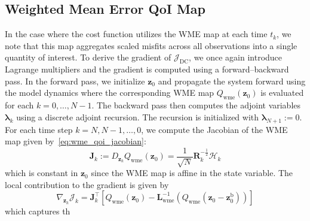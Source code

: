 \documentclass[final,1p,times]{elsarticle}
\begin{document}
\subsection{Weighted Mean Error QoI Map}
In the case where the cost function utilizes the WME map at each time $ t_k $, we note that this map aggregates scaled misfits across all observations into a single quantity of interest. To derive the gradient of $ \mathcal{J}_{\mathrm{DC}} $, we once again introduce Lagrange multipliers and the gradient is computed using a forward–backward pass. In the forward pass, we initialize $ \mathbf{z}_0 $ and propagate the system forward using the model dynamics where the corresponding WME map $ Q_{\mathrm{wme}}(\mathbf{z}_0) $ is evaluated for each $k=0,\ldots, N-1$. 
The backward pass then computes the adjoint variables $ \boldsymbol{\lambda}_k $ using a discrete adjoint recursion. The recursion is initialized with $ \boldsymbol{\lambda}_{N+1} := 0 $.  For each time step $ k = N, N-1, \dots, 0 $, we compute the Jacobian of the WME map given by~\eqref{eq:wme_qoi_jacobian}:
\begin{equation}
    \mathbf{J}_k := D_{\mathbf{z}_k} Q_{\mathrm{wme}}(\mathbf{z}_0) = \frac{1}{\sqrt{N}} \mathbf{R}^{-\frac{1}{2}}_{k}\mathcal{H}_{k}
\end{equation} which is constant in $ \mathbf{z}_0 $ since the WME map is affine in the state variable. 
The local contribution to the gradient is given by
\begin{equation}
\nabla_{\mathbf{z}_k} \mathcal{J}_k =
      \mathbf{J}_k^\top \left[
         Q_{\mathrm{wme}}\left(\mathbf{z}_0\right) - \mathbf{L}_{\mathrm{wme}}^{-1} \left(Q_{\mathrm{wme}}\left(\mathbf{z}_0 -\mathbf{z}_0^{\mathrm{b}}\right)\right)
        \right]
\end{equation}
which captures th
\end{document}
